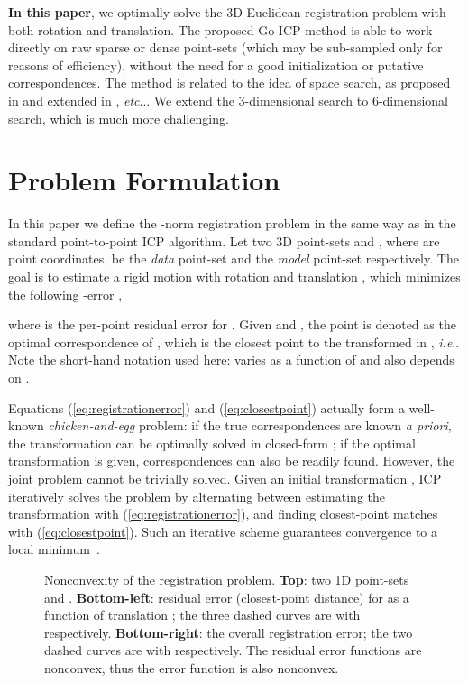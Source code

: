 \documentclass[10pt,journal,cspaper,compsoc]{IEEEtran}
\makeatletter
\DeclareRobustCommand\onedot{\futurelet\@let@token\@onedot}
\def\@onedot{\ifx\@let@token.\else.\null\fi\xspace}
\def\ie{\emph{i.e}\onedot} \def\Ie{\emph{I.e}\onedot}
\def\etc{\emph{etc}\onedot} \def\vs{\emph{vs}\onedot}
\makeatother
\begin{document}
\vspace{0.02in}
\textbf{In this paper}, we optimally solve the 3D Euclidean registration problem with both rotation and translation. The proposed Go-ICP method is able to work directly on raw sparse or dense point-sets (which may be sub-sampled only for reasons of efficiency), without the need for a good initialization or putative correspondences. The method is related to the idea of  space search, as proposed in \cite{hartley2007global,li20073d} and extended in \cite{ruland2012globally,bazin2012globally,yang2014optimal}, \etc. We extend the 3-dimensional  search to 6-dimensional  search, which is much more challenging.

\section{Problem Formulation}\label{sec:formulation}
In this paper we define the -norm registration problem in the same way as in the standard point-to-point ICP algorithm. Let two 3D point-sets  and , where  are point coordinates, be the \emph{data} point-set and the \emph{model} point-set respectively.  The goal is to estimate a rigid motion with rotation  and translation , which minimizes the following -error ,

where  is the per-point residual error for . Given  and , the point  is denoted as the optimal correspondence of , which is the closest point to the transformed  in , \ie
 Note the short-hand notation used here:  varies as a function of  and also depends on .

Equations (\ref{eq:registrationerror}) and (\ref{eq:closestpoint}) actually form a well-known \emph{chicken-and-egg} problem: if the true correspondences are known \emph{a priori}, the transformation can be optimally solved in closed-form \cite{horn1987closed,arun1987least}; if the optimal transformation is given, correspondences can also be readily found. However, the joint problem cannot be trivially solved. Given an initial transformation , ICP iteratively solves the problem by alternating between estimating the transformation with (\ref{eq:registrationerror}), and finding closest-point matches with (\ref{eq:closestpoint}).  Such an iterative scheme guarantees convergence to a local minimum~\cite{besl1992method}.

\begin{figure}[!t]
\begin{center}
\vspace{0pt}
\caption{Nonconvexity of the registration problem. \textbf{Top}: two 1D point-sets  and . \textbf{Bottom-left}: residual error (closest-point distance) for  as a function of translation ; the three dashed curves are  with  respectively. \textbf{Bottom-right}: the overall  registration error; the two dashed curves are  with  respectively. The residual error functions are nonconvex, thus the  error function is also nonconvex.}\label{fig:nonconvexity}
\end{center}
\end{figure}
\end{document}
